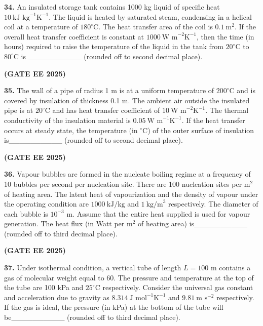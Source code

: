 \documentclass[journal,12pt,onecolumn]{IEEEtran}
\newcommand{\brak}[1]{(#1)}
\begin{document}
\noindent\textbf{34.} An insulated storage tank contains 1000 kg liquid of specific heat $10~\text{kJ kg}^{-1}\text{K}^{-1}$. The liquid is heated by saturated steam, condensing in a helical coil at a temperature of $180^{\circ}\text{C}$. The heat transfer area of the coil is $0.1~\text{m}^{2}$. If the overall heat transfer coefficient is constant at $1000~\text{W m}^{-2}\text{K}^{-1}$, then the time \brak{in hours} required to raise the temperature of the liquid in the tank from $20^{\circ}\text{C}$ to $80^{\circ}\text{C}$ is \_\_\_\_\_\_\_\_\_\_ \brak{rounded off to second decimal place}.

\hfill \textbf{\brak{GATE EE 2025}}

\noindent\textbf{35.} The wall of a pipe of radius 1 m is at a uniform temperature of $200^{\circ}\text{C}$ and is covered by insulation of thickness 0.1 m. The ambient air outside the insulated pipe is at $20^{\circ}\text{C}$ and has heat transfer coefficient of $10~\text{W m}^{-2}\text{K}^{-1}$. The thermal conductivity of the insulation material is $0.05~\text{W m}^{-1}\text{K}^{-1}$. If the heat transfer occurs at steady state, the temperature \brak{in ${}^{\circ}\text{C}$} of the outer surface of insulation is\_\_\_\_\_\_\_\_\_\_ \brak{rounded off to second decimal place}.

\hfill \textbf{\brak{GATE EE 2025}}

\noindent\textbf{36.} Vapour bubbles are formed in the nucleate boiling regime at a frequency of 10 bubbles per second per nucleation site. There are 100 nucleation sites per $\text{m}^{2}$ of heating area. The latent heat of vapourization and the density of vapour under the operating condition are $1000~\text{kJ/kg}$ and $1~\text{kg/m}^{3}$ respectively. The diameter of each bubble is $10^{-3}$ m. Assume that the entire heat supplied is used for vapour generation. The heat flux \brak{in Watt per $\text{m}^{2}$ of heating area} is\_\_\_\_\_\_\_\_\_\_ \brak{rounded off to third decimal place}.

\hfill \textbf{\brak{GATE EE 2025}}

\noindent\textbf{37.} Under isothermal condition, a vertical tube of length $L=100$ m contains a gas of molecular weight equal to 60. The pressure and temperature at the top of the tube are 100 kPa and $25^{\circ}\text{C}$ respectively. Consider the universal gas constant and acceleration due to gravity as $8.314~\text{J mol}^{-1}\text{K}^{-1}$ and $9.81~\text{m s}^{-2}$ respectively. If the gas is ideal, the pressure \brak{in kPa} at the bottom of the tube will be\_\_\_\_\_\_\_\_\_\_ \brak{rounded off to third decimal place}.
\end{document}
